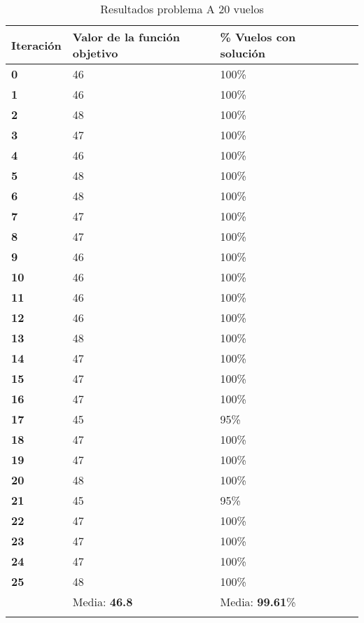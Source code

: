 \begin{longtable}{| p{} | p{} |  p{} | p{}  | p{} | }
	
	\hline
	\textbf{Iteración} & \textbf{Valor de la función objetivo} &\textbf{\% Vuelos con solución} \\ \hline
	\textbf{0} &46  &100\%  \\ \hline
	\textbf{1} &46  &100\%  \\ \hline
	\textbf{2} &48  &100\%  \\ \hline
	\textbf{3} &47  &100\%  \\ \hline
	\textbf{4} &46  &100\%  \\ \hline
	\textbf{5} &48  &100\%  \\ \hline
	\textbf{6} &48  &100\%  \\ \hline
	\textbf{7} &47  &100\%  \\ \hline
	\textbf{8} &47  &100\%  \\ \hline
	\textbf{9} &46  &100\%  \\ \hline
	\textbf{10} &46  &100\%  \\ \hline
	\textbf{11} &46  &100\%  \\ \hline
	\textbf{12} &46  &100\%  \\ \hline
	\textbf{13} &48  &100\%  \\ \hline
	\textbf{14} &47  &100\%  \\ \hline
	\textbf{15} &47  &100\%  \\ \hline
	\textbf{16} &47  &100\%  \\ \hline
	\textbf{17} &45  &95\%  \\ \hline
	\textbf{18} &47  &100\%  \\ \hline
	\textbf{19} &47  &100\%  \\ \hline
	\textbf{20} &48  &100\%  \\ \hline
	\textbf{21} &45  &95\%  \\ \hline
	\textbf{22} &47  &100\%  \\ \hline
	\textbf{23} &47  &100\%  \\ \hline
	\textbf{24} &47  &100\%  \\ \hline
	\textbf{25} &48  &100\%  \\ \hline
				&Media: \textbf{46.8}  &Media: \textbf{99.61}\%  \\ \hline
	\caption{Resultados problema A 20 vuelos }
	\label{tab: Resultados problema A 20 vuelos}

\end{longtable}


